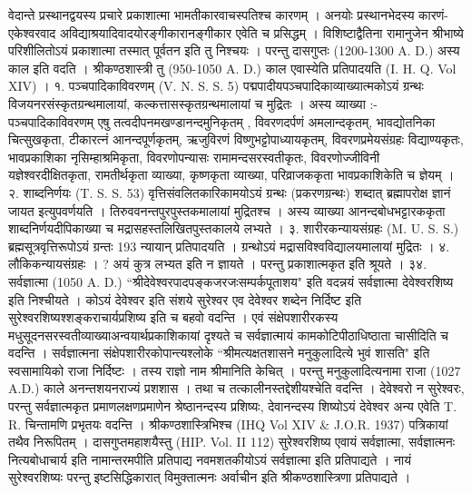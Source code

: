वेदान्ते प्रस्थानद्वयस्य प्रचारे प्रकाशात्मा भामतीकारवाचस्पतिश्च कारणम् । अनयोः प्रस्थानभेदस्य कारणं-एकेश्वरवाद अविद्याश्रयादिवादयोरङ्गीकारानङ्गीकार एवेति च प्रसिद्धम् ।
विशिष्टाद्वैतिना रामानुजेन श्रीभाष्ये परिशीलितोऽयं प्रकाशात्मा तस्मात् पूर्वतन इति तु निश्चयः । परन्तु दासगुप्तः (1200-1300 A. D.) अस्य काल इति वदति । श्रीकण्ठशास्त्री तु (950-1050 A. D.) काल एवास्येति प्रतिपादयति (I. H. Q. Vol XIV) ।
१. पञ्चपादिकाविवरणम् (V. N. S. S. 5)
पद्मपादीयपञ्चपादिकाव्याख्यात्मकोऽयं ग्रन्थः विजयनरसंस्कृतग्रन्थमालायां, कल्कत्तासस्कृतग्रन्थमालायां च मुद्रितः ।
अस्य व्याख्या :-
पञ्चपादिकाविवरणम्
एषु तत्वदीपनमखण्डानन्दमुनिकृतम् , विवरणदर्पणं अमलान्दकृतम्, भावद्योतनिका चित्सुखकृता, टीकारत्नं आनन्दपूर्णकृतम्, ऋजुविरणं विष्णुभट्टोपाध्यायकृतम्, विवरणप्रमेयसंग्रहः विद्याण्यकृतः, भावप्रकाशिका नृसिम्हाश्रमिकृता, विवरणोपन्यासः रामामन्दसरस्वतीकृतः, विवरणोज्जीविनी यज्ञेश्वरदीक्षितकृता, रामतीर्थकृता व्याख्या, कृष्णकृता व्याख्या, परिव्राजककृता भावप्रकाशिकेति च ज्ञेयम् ।
२. शाब्दनिर्णयः (T. S. S. 53)
वृत्तिसंवलितकारिकामयोऽयं ग्रन्थः (प्रकरणग्रन्थः) शब्दात् ब्रह्मापरोक्ष ज्ञानं जायत इत्युपवर्णयति । तिरुववनन्तपुरपुस्तकमालायां मुद्रितश्च । अस्य व्याख्या आनन्दबोधभट्टारककृता शाब्दनिर्णयदीपिकाख्या च मद्रासहस्तलिखितपुस्तकालये लभ्यते ।
३. शारीरकन्यायसंग्रहः (M. U. S. S.)
ब्रह्मसूत्रवृत्तिरूपोऽयं ग्रन्तः 193 न्यायान् प्रतिपादयति । ग्रन्थोऽयं मद्रासविश्वविद्यालयमालायां मुद्रितः ।
४. लौकिकन्यायसंग्रहः । ? अयं कुत्र लभ्यत इति न ज्ञायते । परन्तु प्रकाशात्मकृत इति श्रूयते ।
३४. सर्वज्ञात्मा (1050 A. D.)
``श्रीदेवेश्वरपादपङ्कजरजःसम्पर्कपूताशय" इति वदन्नयं सर्वज्ञात्मा देवेश्वरशिष्य इति निश्चीयते । कोऽयं देवेश्वर इति संशये सुरेश्वर एव देवेश्वर शब्देन निर्दिष्ट इति सुरेश्वरशिष्यश्शङ्कराचार्यप्रशिष्य इति च बहवो वदन्ति । एवं संक्षेपशारीरकस्य मधुसूदनसरस्वतीव्याख्याअन्वयार्थप्रकाशिकायां दृश्यते च सर्वज्ञात्मायं कामकोटिपीठाधिष्ठाता चासीदिति च वदन्ति ।
सर्वज्ञात्मना संक्षेपशारीरकोपान्त्यश्लोके ``श्रीमत्यक्षतशासने मनुकुलादित्ये भुवं शासति" इति स्वसामायिको राजा निर्दिष्टः । तस्य राज्ञो नाम श्रीमानिति केचित् । परन्तु मनुकुलादित्यनामा राजा (1027 A.D.) काले अनन्तशयनराज्यं प्रशशास । तथा च तत्कालीनस्तद्देशीयश्चेति वदन्ति ।
देवेश्वरो न सुरेश्वरः, परन्तु सर्वज्ञात्मकृत प्रमाणलक्षणप्रमाणेन श्रेष्ठानन्दस्य प्रशिष्यः, देवानन्दस्य शिष्योऽयं देवेश्वर अन्य एवेति T. R. चिन्तामणि प्रभृतयः वदन्ति । श्रीकण्ठशास्त्रिभिश्च (IHQ Vol XIV & J.O.R. 1937) पत्रिकायां तथैव निरूपितम् ।
दासगुप्तमहाशयैस्तु (HIP. Vol. II 112) सुरेश्वरशिष्य एवायं सर्वज्ञात्मा, सर्वज्ञात्मनः नित्यबोधाचार्य इति नामान्तरमपीति प्रतिपाद्य नवमशतकीयोऽयं सर्वज्ञात्मा इति प्रतिपाद्यते । नायं सुरेश्वरशिष्यः परन्तु इष्टसिद्धिकारात् विमुक्तात्मनः अर्वाचीन इति श्रीकण्ठशास्त्रिणा प्रतिपाद्यते ।
